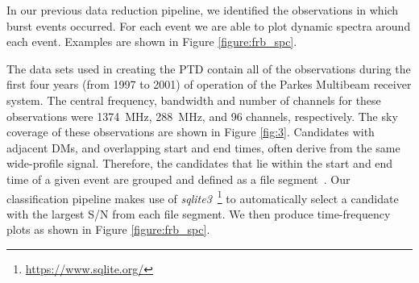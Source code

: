 \documentclass[fleqn,usenatbib]{mnras}
\begin{document}
In our previous data reduction pipeline, we identified the observations in which burst events occurred.  For each event we are able to plot dynamic spectra around each event. Examples are shown in Figure \ref{figure:frb_spc}.




The data sets used in creating the PTD contain all of the observations during the first four years (from 1997 to 2001) of operation of the Parkes Multibeam receiver system. The central frequency, bandwidth and number of channels for these observations were 1374~MHz, 288~MHz, and 96 channels, respectively.   The sky coverage of these observations are shown in Figure \ref{fig:3}. 
Candidates with adjacent DMs, and overlapping start and end times, often derive from the same wide-profile signal. Therefore, the candidates that lie within the start and end time of a given event are grouped and defined as a file segment~\citep[see more details on file segments in][]{Zhang_2020}.
Our classification pipeline makes use of \emph{\sc sqlite3}~\footnote{\url{https://www.sqlite.org/}} to automatically select a candidate with the largest S/N from each file segment. We then produce time-frequency plots as shown in Figure \ref{figure:frb_spc}.


\end{document}
